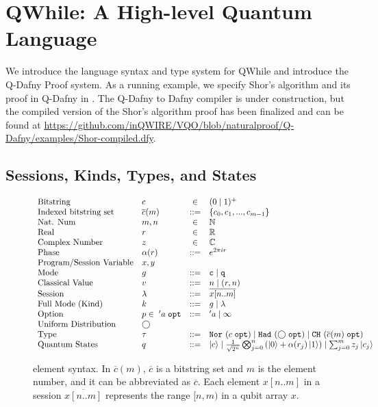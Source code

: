 \section{QWhile: A High-level Quantum Language}
\label{sec:vqir}

We introduce the language syntax and type system for QWhile and introduce the Q-Dafny Proof system.
As a running example, we specify Shor's algorithm and its proof in Q-Dafny in .
The Q-Dafny to Dafny compiler is under construction, but the compiled version of the Shor's algorithm proof has been finalized
and can be found at \url{https://github.com/inQWIRE/VQO/blob/naturalproof/Q-Dafny/examples/Shor-compiled.dfy}.

\subsection{Sessions, Kinds, Types, and States}\label{sec:state}

\begin{figure}[t]
{
  \small
  \[\begin{array}{llcl} 
      \text{Bitstring} & c & \in & (0\mid 1)^{+}       \\
      \text{Indexed bitstring set} & \overline{c}(m) & ::= & \{c_0,c_1,...,c_{m-1}\}       \\
      \text{Nat. Num} & m, n & \in & \mathbb{N}       \\
      \text{Real} & r & \in & \mathbb{R}\\
      \text{Complex Number} & z & \in & \mathbb{C} \\
      \text{Phase} & \alpha(r) & ::= & e^{2\pi i r} \\
      \text{Program/Session Variable} & x,y \\
      \text{Mode} & g & ::= & \texttt{c}  \mid \texttt{q}\\
      \text{Classical Value} & v & ::= & n \mid (r,n)\\
      \text{Session} & \lambda & ::= & \overline{x[n..m]} \\
      \text{Full Mode (Kind)} & k & ::= & g \mid \lambda \\
      \text{Option} & p \in\; 'a\;\texttt{opt} & ::= & 'a \mid \infty \\
      \text{Uniform Distribution} & \bigcirc \\
      \text{Type} & \tau & ::= & \texttt{Nor}~{(c\;\texttt{opt})}\mid \texttt{Had}~{(\bigcirc\;\texttt{opt})}
                    \mid \texttt{CH}~{(\overline{c}(m)\;\texttt{opt})} \\
      \text{Quantum States} & q & ::= & \left\vert{c}\right\rangle\mid \frac{1}{\sqrt{2^n}}\bigotimes_{j=0}^{n}{(\left\vert{0}\right\rangle+\alpha(r_j)\left\vert{1}\right\rangle)} \mid \sum_{j=0}^{m}{z_j\left\vert{c_j}\right\rangle} \\
    \end{array}
  \]
}
  \caption{\qafny element syntax. In $\overline{c}(m)$, $\overline{c}$ is a bitstring set and $m$ is the element number, and it can be abbreviated as $\overline{c}$. Each element $x[n..m]$ in a session $\overline{x[n..m]}$ represents the range $[n,m)$ in a qubit array $x$. }
  \label{fig:qafny-state}
\end{figure}

